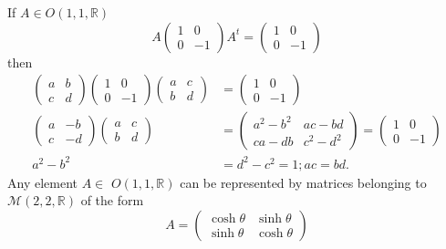 \documentclass[aps,preprint]{revtex4}
\begin{document}
If $A\in O\left( 1,1,\mathbb{R}\right) $ 
\begin{equation}
A\left( 
\begin{array}{cc}
1 & 0 \\ 
0 & -1%
\end{array}%
\right) A^{t}=\left( 
\begin{array}{cc}
1 & 0 \\ 
0 & -1%
\end{array}%
\right)
\end{equation}%
then%
\begin{align}
\left( 
\begin{array}{cc}
a & b \\ 
c & d%
\end{array}%
\right) \left( 
\begin{array}{cc}
1 & 0 \\ 
0 & -1%
\end{array}%
\right) \left( 
\begin{array}{cc}
a & c \\ 
b & d%
\end{array}%
\right) & =\left( 
\begin{array}{cc}
1 & 0 \\ 
0 & -1%
\end{array}%
\right) \\
\left( 
\begin{array}{cc}
a & -b \\ 
c & -d%
\end{array}%
\right) \left( 
\begin{array}{cc}
a & c \\ 
b & d%
\end{array}%
\right) & =\left( 
\begin{array}{cc}
a^{2}-b^{2} & ac-bd \\ 
ca-db & c^{2}-d^{2}%
\end{array}%
\right) =\left( 
\begin{array}{cc}
1 & 0 \\ 
0 & -1%
\end{array}%
\right) \\
a^{2}-b^{2}& =d^{2}-c^{2}=1;ac=bd.
\end{align}%
Any element $A\in $ $O\left( 1,1,\mathbb{R}\right) $ can be represented by
matrices belonging to $\mathcal{M}\left( 2,2,\mathbb{R}\right) $ of the form 
\begin{equation}
A=\left( 
\begin{array}{cc}
\cosh \theta & \sinh \theta \\ 
\sinh \theta & \cosh \theta%
\end{array}%
\right)
\end{equation}%
\end{document}
